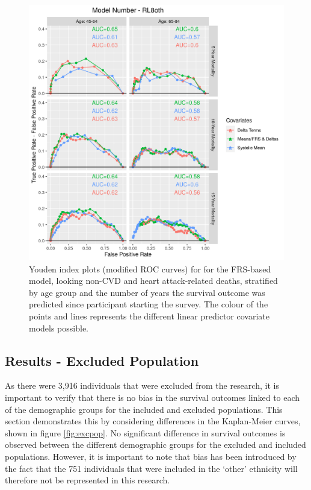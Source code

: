 \documentclass[
]{article}
\begin{document}
\begin{figure}
\centering
\includegraphics{./Rmarkdown_Plots/ROC_CAx-Covariates_EventType_RL8oth.png}
\caption{Youden index plots (modified ROC curves) for for the FRS-based model, looking non-CVD and heart attack-related deaths, stratified by age group and the number of years the survival outcome was predicted since participant starting the survey. The colour of the points and lines represents the different linear predictor covariate models possible.}\label{fig:ROC_RL8oth}
\end{figure}

\subsection{Results - Excluded Population}\label{results---excluded-population}

As there were 3,916 individuals that were excluded from the research, it is important to verify that there is no bias in the survival outcomes linked to each of the demographic groups for the included and excluded populations. This section demonstrates this by considering differences in the Kaplan-Meier curves, shown in figure \ref{fig:excpop}. No significant difference in survival outcomes is observed between the different demographic groups for the excluded and included populations. However, it is important to note that bias has been introduced by the fact that the 751 individuals that were included in the `other' ethnicity will therefore not be represented in this research.
\end{document}
